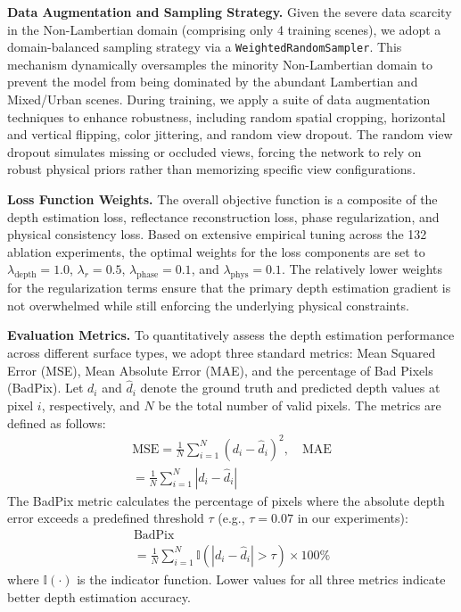 \documentclass[lettersize,journal]{IEEEtran}
\begin{document}
\textbf{Data Augmentation and Sampling Strategy.} 
Given the severe data scarcity in the Non-Lambertian domain (comprising only 4 training scenes), we adopt a domain-balanced sampling strategy via a \texttt{WeightedRandomSampler}. This mechanism dynamically oversamples the minority Non-Lambertian domain to prevent the model from being dominated by the abundant Lambertian and Mixed/Urban scenes. During training, we apply a suite of data augmentation techniques to enhance robustness, including random spatial cropping, horizontal and vertical flipping, color jittering, and random view dropout. The random view dropout simulates missing or occluded views, forcing the network to rely on robust physical priors rather than memorizing specific view configurations.

\textbf{Loss Function Weights.} 
The overall objective function is a composite of the depth estimation loss, reflectance reconstruction loss, phase regularization, and physical consistency loss. Based on extensive empirical tuning across the 132 ablation experiments, the optimal weights for the loss components are set to $\lambda_{\text{depth}} = 1.0$, $\lambda_{r} = 0.5$, $\lambda_{\text{phase}} = 0.1$, and $\lambda_{\text{phys}} = 0.1$. The relatively lower weights for the regularization terms ensure that the primary depth estimation gradient is not overwhelmed while still enforcing the underlying physical constraints.

\textbf{Evaluation Metrics.} 
To quantitatively assess the depth estimation performance across different surface types, we adopt three standard metrics: Mean Squared Error (MSE), Mean Absolute Error (MAE), and the percentage of Bad Pixels (BadPix). Let $d_i$ and $\hat{d}_i$ denote the ground truth and predicted depth values at pixel $i$, respectively, and $N$ be the total number of valid pixels. The metrics are defined as follows:
\begin{multline}

\text{MSE} = \frac{1}{N} \sum_{i=1}^{N} (d_i - \hat{d}_i)^2, \quad \text{MAE} \\
= \frac{1}{N} \sum_{i=1}^{N} |d_i - \hat{d}_i|
\end{multline}
The BadPix metric calculates the percentage of pixels where the absolute depth error exceeds a predefined threshold $\tau$ (e.g., $\tau = 0.07$ in our experiments):
\begin{multline}

\text{BadPix} \\
= \frac{1}{N} \sum_{i=1}^{N} \mathbb{I}(|d_i - \hat{d}_i| > \tau) \times 100\%
\end{multline}
where $\mathbb{I}(\cdot)$ is the indicator function. Lower values for all three metrics indicate better depth estimation accuracy.
\end{document}
